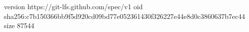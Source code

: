 version https://git-lfs.github.com/spec/v1
oid sha256:c7b150366bb9f5d920cd09bd77e052361430f326227e44e8d0c3860637b7ec44
size 87544
